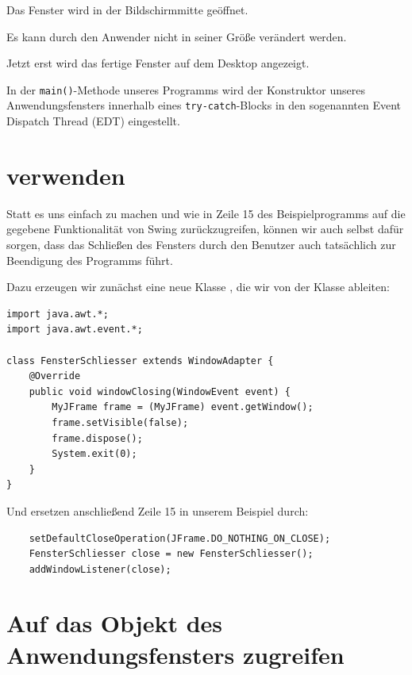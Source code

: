 \begin{compactitem}
\item[Zeile 34:] Das Fenster wird in der Bildschirmmitte geöffnet.

\item[Zeile 35:] Es kann durch den Anwender nicht in seiner Größe verändert
werden.

\item[Zeile 36:] Jetzt erst wird das fertige Fenster auf dem Desktop angezeigt.

\item[Zeile 44-50:] In der \lstinline|main()|-Methode unseres Programms wird der
Konstruktor unseres Anwendungsfensters innerhalb eines
\lstinline|try-catch|-Blocks in den sogenannten Event Dispatch Thread (EDT)
eingestellt.
\end{compactitem}


\section{ verwenden}

Statt es uns einfach zu machen und wie in Zeile 15 des Beispielprogramms auf
die gegebene Funktionalität von Swing zurückzugreifen, können wir auch selbst
dafür sorgen, dass das Schließen des Fensters durch den Benutzer auch
tatsächlich zur Beendigung des Programms führt.

Dazu erzeugen wir zunächst eine neue Klasse , die wir
von der Klasse  ableiten:

\begin{lstlisting}
import java.awt.*;
import java.awt.event.*;

class FensterSchliesser extends WindowAdapter {
    @Override
    public void windowClosing(WindowEvent event) {
        MyJFrame frame = (MyJFrame) event.getWindow();
        frame.setVisible(false);
        frame.dispose();
        System.exit(0);
    }
}
\end{lstlisting}

Und ersetzen anschließend Zeile 15 in unserem Beispiel durch:

\begin{lstlisting}
    setDefaultCloseOperation(JFrame.DO_NOTHING_ON_CLOSE);
    FensterSchliesser close = new FensterSchliesser();
    addWindowListener(close);
\end{lstlisting}


\section{Auf das Objekt des Anwendungsfensters zugreifen}

